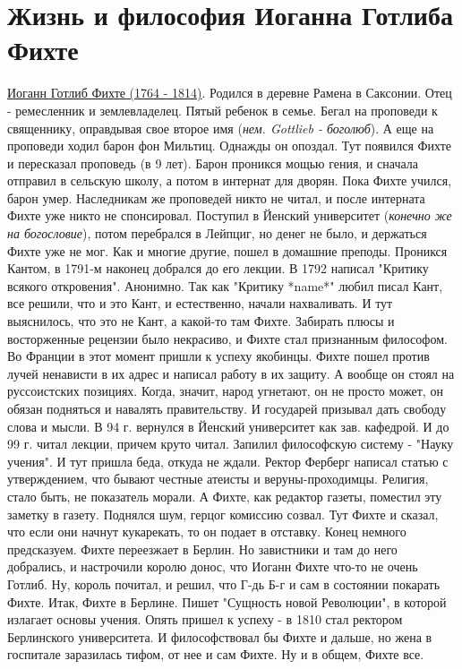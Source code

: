 \section{Жизнь и философия Иоганна Готлиба Фихте}
\underline{Иоганн Готлиб Фихте (1764 - 1814)}. Родился в деревне Рамена в Саксонии. Отец - ремесленник и землевладелец. Пятый ребенок в семье. Бегал на проповеди к священнику, оправдывая свое второе имя (\textit{нем. Gottlieb - боголюб}). А еще на проповеди ходил барон фон Мильтиц. Однажды он опоздал. Тут появился Фихте и пересказал проповедь (в 9 лет). Барон проникся мощью гения, и сначала отправил в сельскую школу, а потом в интернат для дворян. Пока Фихте учился, барон умер. Наследникам же проповедей никто не читал, и после интерната Фихте уже никто не спонсировал. Поступил в Йенский университет (\textit{конечно же на богословие}), потом перебрался в Лейпциг, но денег не было, и держаться Фихте уже не мог. Как и многие другие, пошел в домашние преподы. Проникся Кантом, в 1791-м наконец добрался до его лекции. В 1792 написал "Критику всякого откровения". Анонимно. Так как "Критику *name*" любил писал Кант, все решили, что и это Кант, и естественно, начали нахваливать. И тут выяснилось, что это не Кант, а какой-то там Фихте. Забирать плюсы и восторженные рецензии было некрасиво, и Фихте стал признанным философом. Во Франции в этот момент пришли к успеху якобинцы. Фихте пошел против лучей ненависти в их адрес и написал работу в их защиту. А вообще он стоял на руссоистских позициях. Когда, значит, народ угнетают, он не просто может, он обязан подняться и навалять правительству. И государей призывал дать свободу слова и мысли. В 94 г. вернулся в Йенский университет как зав. кафедрой. И  до 99 г. читал лекции, причем круто читал. Запилил философскую систему - "Науку учения".
И тут пришла беда, откуда не ждали. Ректор Ферберг написал статью с утверждением, что бывают честные атеисты и веруны-проходимцы. Религия, стало быть, не показатель морали. А Фихте, как редактор газеты, поместил эту заметку в газету. Поднялся шум, герцог комиссию созвал. Тут Фихте и сказал, что если они начнут кукарекать, то он подает в отставку. Конец немного предсказуем. Фихте переезжает в Берлин. Но завистники и там до него добрались, и настрочили королю донос, что Иоганн Фихте что-то не очень Готлиб. Ну, король почитал, и решил, что Г-дь Б-г и сам в состоянии покарать Фихте. Итак, Фихте в Берлине. Пишет "Сущность новой Революции", в которой излагает основы учения. Опять пришел к успеху - в 1810 стал ректором Берлинского университета. И философствовал бы Фихте и дальше, но жена в госпитале заразилась тифом, от нее и сам Фихте. Ну и в общем, Фихте все.


